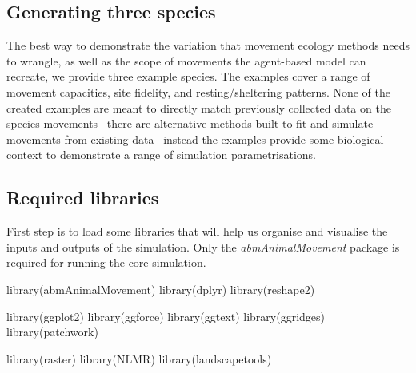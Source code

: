 \documentclass[10pt,a4paper]{article}
\newenvironment{Shaded}{}{}
\newcommand{\FunctionTok}[1]{#1}
\newcommand{\NormalTok}[1]{#1}
\begin{document}
\hypertarget{generating-three-species}{%
\subsection{Generating three species}\label{generating-three-species}}

The best way to demonstrate the variation that movement ecology methods needs to wrangle, as well as the scope of movements the agent-based model can recreate, we provide three example species.
The examples cover a range of movement capacities, site fidelity, and resting/sheltering patterns.
None of the created examples are meant to directly match previously collected data on the species movements --there are alternative methods built to fit and simulate movements from existing data-- instead the examples provide some biological context to demonstrate a range of simulation parametrisations.

\hypertarget{required-libraries}{%
\subsection{Required libraries}\label{required-libraries}}

First step is to load some libraries that will help us organise and visualise the inputs and outputs of the simulation.
Only the \emph{abmAnimalMovement} package is required for running the core simulation.

\begin{Shaded}
\begin{Highlighting}[]
\FunctionTok{library}\NormalTok{(abmAnimalMovement)}
\FunctionTok{library}\NormalTok{(dplyr)}
\FunctionTok{library}\NormalTok{(reshape2)}

\FunctionTok{library}\NormalTok{(ggplot2)}
\FunctionTok{library}\NormalTok{(ggforce)}
\FunctionTok{library}\NormalTok{(ggtext)}
\FunctionTok{library}\NormalTok{(ggridges)}
\FunctionTok{library}\NormalTok{(patchwork)}

\FunctionTok{library}\NormalTok{(raster)}
\FunctionTok{library}\NormalTok{(NLMR)}
\FunctionTok{library}\NormalTok{(landscapetools)}
\end{Highlighting}
\end{Shaded}
\end{document}
